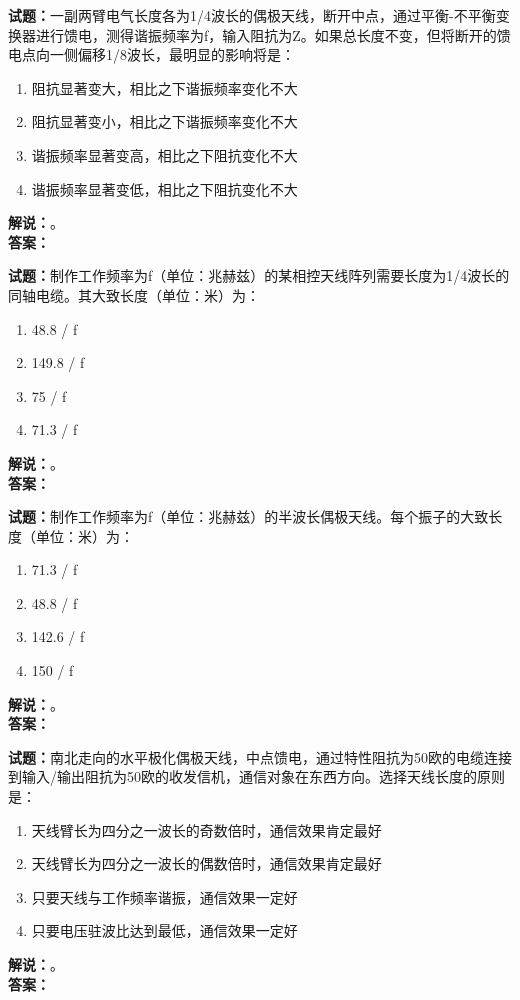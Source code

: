 \documentclass{ctexbook}
\begin{document}
\bigskip




\noindent\textbf{试题：}一副两臂电气长度各为1/4波长的偶极天线，断开中点，通过平衡-不平衡变换器进行馈电，测得谐振频率为f，输入阻抗为Z。如果总长度不变，但将断开的馈电点向一侧偏移1/8波长，最明显的影响将是：
\begin{enumerate}[leftmargin=3em]
\item 阻抗显著变大，相比之下谐振频率变化不大
\item 阻抗显著变小，相比之下谐振频率变化不大
\item 谐振频率显著变高，相比之下阻抗变化不大
\item 谐振频率显著变低，相比之下阻抗变化不大
\end{enumerate}
\noindent\textbf{解说：}\textbf{}。\\\noindent\textbf{答案：}

\bigskip




\noindent\textbf{试题：}制作工作频率为f（单位：兆赫兹）的某相控天线阵列需要长度为1/4波长的同轴电缆。其大致长度（单位：米）为：
\begin{enumerate}[leftmargin=3em]
\item 48.8 / f
\item 149.8 / f
\item 75 / f
\item 71.3 / f
\end{enumerate}
\noindent\textbf{解说：}\textbf{}。\\\noindent\textbf{答案：}

\bigskip




\noindent\textbf{试题：}制作工作频率为f（单位：兆赫兹）的半波长偶极天线。每个振子的大致长度（单位：米）为：
\begin{enumerate}[leftmargin=3em]
\item 71.3 / f
\item 48.8 / f
\item 142.6 / f
\item 150 / f
\end{enumerate}
\noindent\textbf{解说：}\textbf{}。\\\noindent\textbf{答案：}

\bigskip




\noindent\textbf{试题：}南北走向的水平极化偶极天线，中点馈电，通过特性阻抗为50欧的电缆连接到输入/输出阻抗为50欧的收发信机，通信对象在东西方向。选择天线长度的原则是：
\begin{enumerate}[leftmargin=3em]
\item 天线臂长为四分之一波长的奇数倍时，通信效果肯定最好
\item 天线臂长为四分之一波长的偶数倍时，通信效果肯定最好
\item 只要天线与工作频率谐振，通信效果一定好
\item 只要电压驻波比达到最低，通信效果一定好
\end{enumerate}
\noindent\textbf{解说：}\textbf{}。\\\noindent\textbf{答案：}
\end{document}
